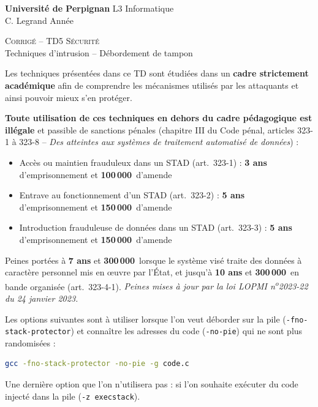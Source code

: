 \documentclass[a4paper,11pt]{article}
\theoremstyle{plain}
\theoremstyle{definition}
\begin{document}
\hbox{}
\noindent \textbf{Université de Perpignan} \hfill  L3 Informatique \\
 \hfill C. Legrand \hfill  Année \the\year \\
\smallskip
\begin{center}
{
  {\scshape \large Corrigé -- TD5 Sécurité}  \\
 Techniques d'intrusion -- Débordement de tampon
}
\end{center}
\hbox{}

\bigskip

\begin{ethique}
Les techniques présentées dans ce TD sont étudiées dans un \textbf{cadre strictement académique} afin de comprendre les mécanismes utilisés par les attaquants et ainsi pouvoir mieux s'en protéger.

\textbf{Toute utilisation de ces techniques en dehors du cadre pédagogique est illégale} et passible de sanctions pénales (chapitre III du Code pénal, articles 323-1 à 323-8 -- \textit{Des atteintes aux systèmes de traitement automatisé de données}) :
\begin{itemize}
    \item Accès ou maintien frauduleux dans un STAD (art.~323-1) : \textbf{3 ans} d'emprisonnement et \textbf{100\,000\,\texteuro{}} d'amende
    \item Entrave au fonctionnement d'un STAD (art.~323-2) : \textbf{5 ans} d'emprisonnement et \textbf{150\,000\,\texteuro{}} d'amende
    \item Introduction frauduleuse de données dans un STAD (art.~323-3) : \textbf{5 ans} d'emprisonnement et \textbf{150\,000\,\texteuro{}} d'amende
\end{itemize}
Peines portées à \textbf{7 ans} et \textbf{300\,000\,\texteuro{}} lorsque le système visé traite des données à caractère personnel mis en \oe uvre par l'État, et jusqu'à \textbf{10 ans} et \textbf{300\,000\,\texteuro{}} en bande organisée (art.~323-4-1). \textit{Peines mises à jour par la loi LOPMI n\textsuperscript{o}2023-22 du 24 janvier 2023.}
\end{ethique}

\bigskip

\begin{tcolorbox}[colback=gray!5!white, colframe=gray!60!black, title={Options de compilation}]
Les options suivantes sont à utiliser lorsque l'on veut déborder sur la pile (\texttt{-fno-stack-protector}) et connaître les adresses du code (\texttt{-no-pie}) qui ne sont plus randomisées :
\begin{lstlisting}[language=bash,numbers=none]
gcc -fno-stack-protector -no-pie -g code.c
\end{lstlisting}
Une dernière option que l'on n'utilisera pas : si l'on souhaite exécuter du code injecté dans la pile (\texttt{-z execstack}).
\end{tcolorbox}
\end{document}
